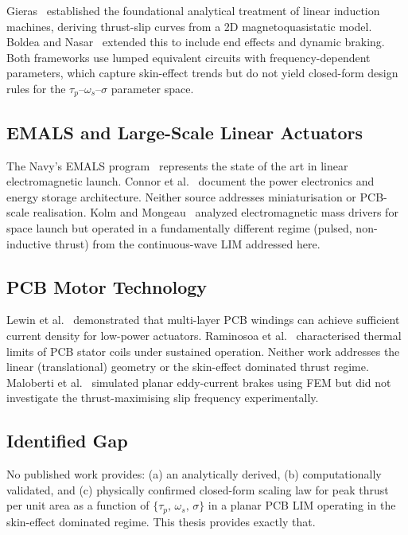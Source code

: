 \documentclass[12pt,letterpaper]{article}
\begin{document}
Gieras~\cite{Gieras1994} established the foundational analytical treatment of linear
induction machines, deriving thrust-slip curves from a 2D magnetoquasistatic model.
Boldea and Nasar~\cite{Boldea2001} extended this to include end effects and dynamic braking.
Both frameworks use lumped equivalent circuits with frequency-dependent parameters,
which capture skin-effect trends but do not yield closed-form design rules for the
$\tau_p$--$\omega_s$--$\sigma$ parameter space.

\subsection{EMALS and Large-Scale Linear Actuators}

The Navy's EMALS program~\cite{Doyle2010} represents the state of the art in linear
electromagnetic launch. Connor et al.~\cite{Connor2015} document the power electronics
and energy storage architecture. Neither source addresses miniaturisation or PCB-scale
realisation. Kolm and Mongeau~\cite{Kolm1980} analyzed electromagnetic mass drivers for
space launch but operated in a fundamentally different regime (pulsed, non-inductive
thrust) from the continuous-wave LIM addressed here.

\subsection{PCB Motor Technology}

Lewin et al.~\cite{Lewin2006} demonstrated that multi-layer PCB windings can achieve
sufficient current density for low-power actuators. Raminosoa et al.~\cite{Raminosoa2018}
characterised thermal limits of PCB stator coils under sustained operation. Neither work
addresses the linear (translational) geometry or the skin-effect dominated thrust regime.
Maloberti et al.~\cite{Maloberti2020} simulated planar eddy-current brakes using FEM
but did not investigate the thrust-maximising slip frequency experimentally.

\subsection{Identified Gap}

No published work provides: (a) an analytically derived, (b) computationally validated,
and (c) physically confirmed closed-form scaling law for peak thrust per unit area as a
function of $\{\tau_p,\,\omega_s,\,\sigma\}$ in a planar PCB LIM operating in the
skin-effect dominated regime. This thesis provides exactly that.
\end{document}
